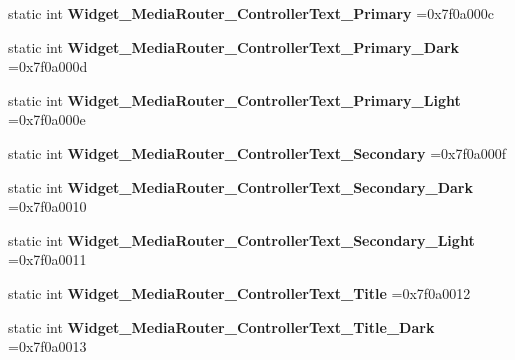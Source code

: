 \begin{DoxyCompactItemize}
static int {\bfseries Widget\+\_\+\+Media\+Router\+\_\+\+Controller\+Text\+\_\+\+Primary} =0x7f0a000c
\item 
\mbox{\label{classandroid_1_1support_1_1v4_1_1R_1_1style_ad10eecc32809f2437af36f032785fce6}} 
static int {\bfseries Widget\+\_\+\+Media\+Router\+\_\+\+Controller\+Text\+\_\+\+Primary\+\_\+\+Dark} =0x7f0a000d
\item 
\mbox{\label{classandroid_1_1support_1_1v4_1_1R_1_1style_aa19ce7e7a669701465829e76c89a6751}} 
static int {\bfseries Widget\+\_\+\+Media\+Router\+\_\+\+Controller\+Text\+\_\+\+Primary\+\_\+\+Light} =0x7f0a000e
\item 
\mbox{\label{classandroid_1_1support_1_1v4_1_1R_1_1style_a5f192950fd0ea23ebed2b033a24b9a9a}} 
static int {\bfseries Widget\+\_\+\+Media\+Router\+\_\+\+Controller\+Text\+\_\+\+Secondary} =0x7f0a000f
\item 
\mbox{\label{classandroid_1_1support_1_1v4_1_1R_1_1style_a0de13ab6ea107372b47f861529b80e90}} 
static int {\bfseries Widget\+\_\+\+Media\+Router\+\_\+\+Controller\+Text\+\_\+\+Secondary\+\_\+\+Dark} =0x7f0a0010
\item 
\mbox{\label{classandroid_1_1support_1_1v4_1_1R_1_1style_a6ea53dd4cbf51cb0153a41e45f8ff978}} 
static int {\bfseries Widget\+\_\+\+Media\+Router\+\_\+\+Controller\+Text\+\_\+\+Secondary\+\_\+\+Light} =0x7f0a0011
\item 
\mbox{\label{classandroid_1_1support_1_1v4_1_1R_1_1style_a27262c9ab6a215bc7de91a149323fe05}} 
static int {\bfseries Widget\+\_\+\+Media\+Router\+\_\+\+Controller\+Text\+\_\+\+Title} =0x7f0a0012
\item 
\mbox{\label{classandroid_1_1support_1_1v4_1_1R_1_1style_ae198f225a2d17073e44684b192fbe0cf}} 
static int {\bfseries Widget\+\_\+\+Media\+Router\+\_\+\+Controller\+Text\+\_\+\+Title\+\_\+\+Dark} =0x7f0a0013
\item 
\mbox{\label{classandroid_1_1support_1_1v4_1_1R_1_1style_ad6a4c088029857256c08f7a3fcb8972f}} 

\end{DoxyCompactItemize}
